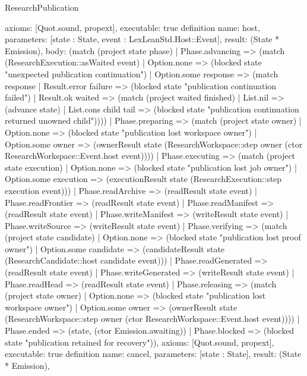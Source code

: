 \begin{lexlean}{ResearchPublication}
\begin{semanticmodule}
{ axioms: [Quot.sound, propext],
 executable: true
}
definition{
 name: host,
 parameters: [state : State, event : LexLeanStd.Host::Event],
 result: (State * Emission),
 body: (match (project state phase) | Phase.advancing => (match (ResearchExecution::asWaited event) | Option.none => (blocked state "unexpected publication continuation") | Option.some response => (match response | Result.error failure => (blocked state "publication continuation failed") | Result.ok waited => (match (project waited finished) | List.nil => (advance state) | List.cons child tail => (blocked state "publication continuation returned unowned child")))) | Phase.preparing => (match (project state owner) | Option.none => (blocked state "publication lost workspace owner") | Option.some owner => (ownerResult state (ResearchWorkspace::step owner (ctor ResearchWorkspace::Event.host event)))) | Phase.executing => (match (project state execution) | Option.none => (blocked state "publication lost job owner") | Option.some execution => (executionResult state (ResearchExecution::step execution event))) | Phase.readArchive => (readResult state event) | Phase.readFrontier => (readResult state event) | Phase.readManifest => (readResult state event) | Phase.writeManifest => (writeResult state event) | Phase.writeSource => (writeResult state event) | Phase.verifying => (match (project state candidate) | Option.none => (blocked state "publication lost proof owner") | Option.some candidate => (candidateResult state (ResearchCandidate::host candidate event))) | Phase.readGenerated => (readResult state event) | Phase.writeGenerated => (writeResult state event) | Phase.readHead => (readResult state event) | Phase.releasing => (match (project state owner) | Option.none => (blocked state "publication lost workspace owner") | Option.some owner => (ownerResult state (ResearchWorkspace::step owner (ctor ResearchWorkspace::Event.host event)))) | Phase.ended => (state, (ctor Emission.awaiting)) | Phase.blocked => (blocked state "publication retained for recovery")),
 axioms: [Quot.sound, propext],
 executable: true
}
definition{
 name: cancel,
 parameters: [state : State],
 result: (State * Emission),
}
\end{semanticmodule}
\end{lexlean}
